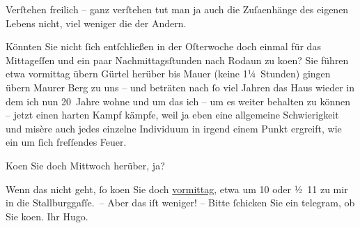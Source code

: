 \pstart
           Verſtehen freilich – ganz verſtehen tut man ja auch die Zuſa{\geminationm}enhänge des eigenen Lebens nicht, viel weniger die der
               Andern.\pend
           
\pstart
           Könnten Sie nicht{ }ſich entſchließen in der Oſterwoche doch einmal für
               das Mittageſſen und ein paar Nachmittagsſtunden nach Rodaun zu ko{\geminationm}en? {\pb}Sie führen etwa vormittag übern
                  Gürtel herüber bis Mauer (keine 1¼ Stunden) gingen übern Maurer Berg zu uns – und beträten nach{ }ſo viel Jahren das Haus wieder in dem ich nun
               20 Jahre wohne und um das ich – um es weiter behalten zu können – jetzt einen harten
               Kampf kämpfe, weil ja eben eine {\pb}allgemeine Schwierigkeit und misère auch jedes einzelne Individuum in irgend einem
               Punkt ergreift, wie ein um{ }ſich freſſendes Feuer.\pend
           
\pstart
           Ko{\geminationm}en Sie doch Mittwoch herüber, ja?\pend
           
\pstart
           Wenn das nicht geht,{ }ſo ko{\geminationm}en Sie doch \label{K_L02364-1v}\label{K_L02364-1}{ }\uline{vormittag}, etwa um 10 oder ½ 11 zu mir in die Stallburggaſſe. – Aber das iſt weniger! – Bitte{ }ſchicken Sie ein telegram, ob Sie ko{\geminationm}en.\pend
           \pstart Ihr \spacefill\mbox{Hugo.}\pend{}\endnumbering{}  \newcommand{\dateiname}{L02364}\newcommand{\titel}{Hugo Hofmannsthal an Arthur Schnitzler, [19. 3. 1921]}\newcommand{\editorInnen}{Martin Anton Müller und Gerd-Hermann Susen}
